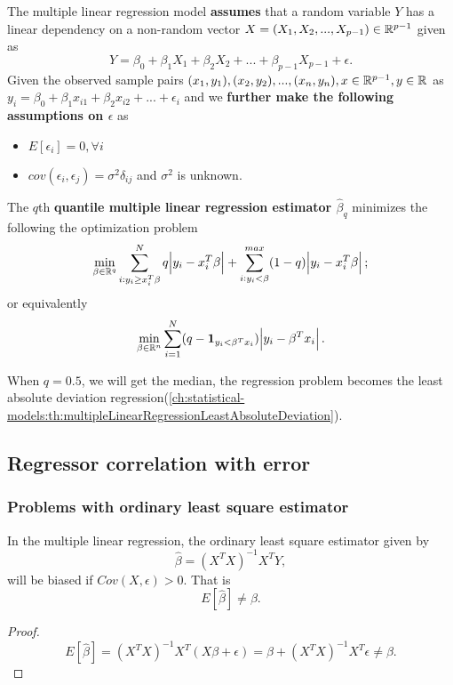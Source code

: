 \begin{refsection}
\begin{definition}\cite[87]{cameron2005microeconometrics} 
	The multiple linear regression model \textbf{assumes} that a random variable $Y$ has a linear dependency on a non-random vector $X = (X_1,X_2,...,X_{p-1}) \in \mathbb{R}^{p-1}$ given as
	$$Y = \beta_0 + \beta_1 X_1 +\beta_2 X_2 + ... +\beta_{p-1} X_{p-1} + \epsilon.$$
	Given the observed sample pairs $(x_1,y_1),(x_2,y_2),..., (x_n,y_n), x\in \mathbb{R}^{p-1}, y\in \mathbb{R}$ as $y_i = \beta_0 + \beta_1 x_{i1} + \beta_2 x_{i2} + ... + \epsilon_i$ and we \textbf{further make the following assumptions on $\epsilon$} as
	\begin{itemize}
		\item $E[\epsilon_i] = 0,\forall i$
		\item $cov(\epsilon_i,\epsilon_j) = \sigma^2\delta_{ij}$ and $\sigma^2$ is unknown.
	\end{itemize} 	
	
The $q$th \textbf{quantile multiple linear regression estimator $\hat{\beta}_q$} minimizes the following the optimization problem
$$\min_{\beta \in \mathbb{R}^q} \sum_{i:y_i\geq x_i^T\beta}^{N} q\abs{y_i-x_i^T\beta} + \sum_{i:y_i < \beta}^{max}(1-q)\abs{y_i-x_i^T\beta};$$
or equivalently
$$\min_{\beta \in \mathbb{R}^n} \sum_{i=1}^{N} (q-\bm{1}_{y_i<\beta^Tx_i})\abs{y_i-\beta^Tx_i}.$$

\end{definition}

\begin{remark}
When $q = 0.5$, we will get the median, the regression problem becomes the least absolute deviation regression(\autoref{ch:statistical-models:th:multipleLinearRegressionLeastAbsoluteDeviation}). 
\end{remark}


\subsection{Regressor correlation with error}

\subsubsection{Problems with ordinary least square estimator}

\begin{lemma}
In the multiple linear regression, the ordinary least square estimator given by
$$\hat{\beta} = (X^TX)^{-1}X^TY,$$
will be biased if $Cov(X,\epsilon) > 0.$
That is
$$E[\hat{\beta}] \neq \beta.$$	
\end{lemma}
\begin{proof}
$$E[\hat{\beta}] = (X^TX)^{-1}X^T(X\beta+\epsilon) = \beta + (X^TX)^{-1}X^T\epsilon\neq \beta.$$	
\end{proof}


\end{refsection}
